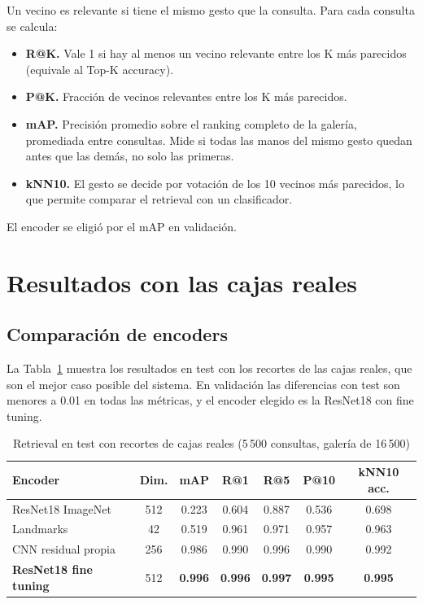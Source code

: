 \documentclass[11pt,letterpaper]{article}
\newcommand{\fuente}[1]{\par\vspace{2pt}{\footnotesize Fuente: #1}}
\begin{document}
Un vecino es relevante si tiene el mismo gesto que la consulta. Para cada consulta se calcula:

\begin{itemize}
    \item \textbf{R@K.} Vale 1 si hay al menos un vecino relevante entre los K más parecidos
    (equivale al Top-K accuracy).
    \item \textbf{P@K.} Fracción de vecinos relevantes entre los K más parecidos.
    \item \textbf{mAP.} Precisión promedio sobre el ranking completo de la galería, promediada entre
    consultas. Mide si todas las manos del mismo gesto quedan antes que las demás, no solo las primeras.
    \item \textbf{kNN10.} El gesto se decide por votación de los 10 vecinos más parecidos, lo que
    permite comparar el retrieval con un clasificador.
\end{itemize}

El encoder se eligió por el mAP en validación.

\newpage
\section{Resultados con las cajas reales}

\subsection{Comparación de encoders}

La Tabla~\ref{tab:encoders} muestra los resultados en test con los recortes de las cajas reales,
que son el mejor caso posible del sistema. En validación las diferencias con test son menores a
0.01 en todas las métricas, y el encoder elegido es la ResNet18 con fine tuning.

\begin{table}[!htb]
\centering
\caption{Retrieval en test con recortes de cajas reales (5\,500 consultas, galería de 16\,500)}
\label{tab:encoders}
\begin{tabular}{lcccccc}
\toprule
Encoder & Dim. & mAP & R@1 & R@5 & P@10 & kNN10 acc. \\
\midrule
ResNet18 ImageNet & 512 & 0.223 & 0.604 & 0.887 & 0.536 & 0.698 \\
Landmarks & 42 & 0.519 & 0.961 & 0.971 & 0.957 & 0.963 \\
CNN residual propia & 256 & 0.986 & 0.990 & 0.996 & 0.990 & 0.992 \\
\textbf{ResNet18 fine tuning} & 512 & \textbf{0.996} & \textbf{0.996} & \textbf{0.997} & \textbf{0.995} & \textbf{0.995} \\
\bottomrule
\end{tabular}
\fuente{Elaboración propia.}
\end{table}
\end{document}
